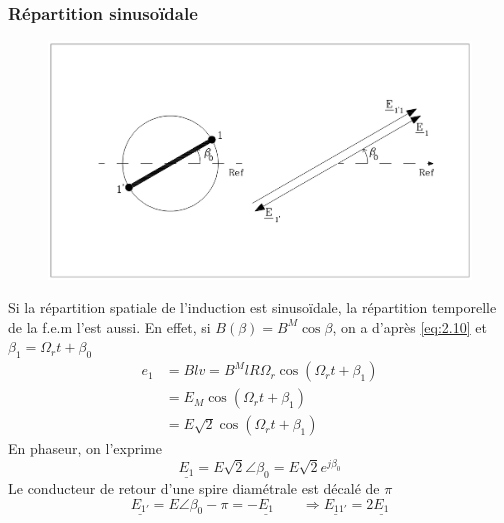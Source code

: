 		\subsubsection{Répartition sinusoïdale}
			\begin{figure}
			\vspace{-5mm}
			\includegraphics[scale=0.2]{ch2/image3} 
			\end{figure}
		Si la répartition spatiale de l'induction est sinusoïdale, la répartition temporelle de la f.e.m l'est aussi. En effet, si $B(\beta )= B^M\cos \beta$, on a d'après \autoref{eq:2.10} et $\beta _1 = \Omega _r t + \beta _0$
			\begin{equation}
			\begin{aligned}
				e_1 &= Blv = B^M lR\Omega _r \cos (\Omega _r t + \beta _1)\\
				 &= E_M \cos (\Omega _r t + \beta _1) \\
				 &= E\sqrt{2}\cos (\Omega _r t + \beta _1)
				\end{aligned}
			\end{equation}
		En phaseur, on l'exprime 
		\begin{equation}
			\underline{E_1} = E\sqrt{2} \angle \beta _0 = E\sqrt{2} e^{j\beta _0}
		\end{equation}
		Le conducteur de retour d'une spire diamétrale est décalé de $\pi$		
		\begin{equation}
			\underline{E_{1'}} = E\angle \beta _0 -\pi = -\underline{E_1}\qquad \Rightarrow \underline{E_{11'}} = 2\underline{E_1}
		\end{equation}
		

